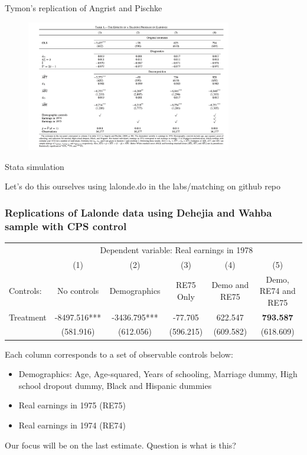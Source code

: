 \documentclass{beamer}
\begin{document}
\begin{frame}{Tymon's replication of Angrist and Pischke}
    \begin{figure}
        \centering
        \includegraphics[width=0.8\textwidth]{./lecture_includes/tymon_lalonde_table1.png}
    \end{figure}
\end{frame}

\begin{frame}{Stata simulation}

Let's do this ourselves using lalonde.do in the labs/matching on github repo

\end{frame}


\begin{frame}
\frametitle{Replications of Lalonde data using Dehejia and Wahba sample with CPS control}

\tiny
\begin{tabular}{lccccc}
\hline \hline
 & \multicolumn{5}{c}{Dependent variable: Real earnings in 1978} \\
 & (1) & (2) & (3) & (4) & (5) \\
Controls: & No controls & Demographics & RE75 Only & Demo and RE75 & Demo, RE74 and RE75 \\
\hline
Treatment                 &   -8497.516***&   -3436.795***&     -77.705   &     622.547   &     \textbf{793.587}   \\
                    		&   (581.916)   &   (612.056)   &   (596.215)   &   (609.582)   &   (618.609)   \\
\hline \end{tabular}

\bigskip

Each column corresponds to a set of observable controls below:
\begin{itemize}
\item Demographics: Age, Age-squared, Years of schooling, Marriage dummy, High school dropout dummy, Black and Hispanic dummies
\item Real earnings in 1975 (RE75)
\item Real earnings in 1974 (RE74)
\end{itemize}

Our focus will be on the last estimate.  Question is what is this?

\end{frame}
\end{document}
